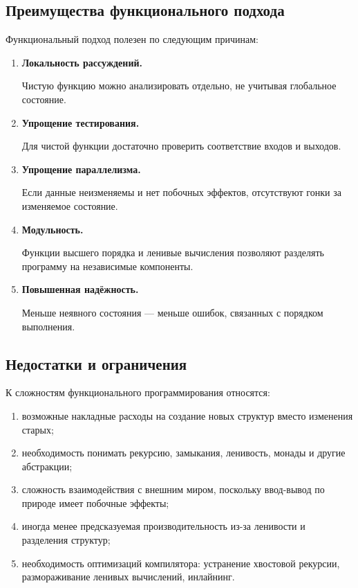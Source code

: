 \documentclass[12pt,a4paper]{article}
\begin{document}
\subsection{Преимущества функционального подхода}

Функциональный подход полезен по следующим причинам:

\begin{enumerate}
  \item \textbf{Локальность рассуждений.}

  Чистую функцию можно анализировать отдельно, не учитывая глобальное состояние.

  \item \textbf{Упрощение тестирования.}

  Для чистой функции достаточно проверить соответствие входов и выходов.

  \item \textbf{Упрощение параллелизма.}

  Если данные неизменяемы и нет побочных эффектов, отсутствуют гонки за изменяемое состояние.

  \item \textbf{Модульность.}

  Функции высшего порядка и ленивые вычисления позволяют разделять программу на независимые компоненты.

  \item \textbf{Повышенная надёжность.}

  Меньше неявного состояния --- меньше ошибок, связанных с порядком выполнения.
\end{enumerate}

\subsection{Недостатки и ограничения}

К сложностям функционального программирования относятся:

\begin{enumerate}
  \item возможные накладные расходы на создание новых структур вместо изменения старых;
  \item необходимость понимать рекурсию, замыкания, ленивость, монады и другие абстракции;
  \item сложность взаимодействия с внешним миром, поскольку ввод-вывод по природе имеет побочные эффекты;
  \item иногда менее предсказуемая производительность из-за ленивости и разделения структур;
  \item необходимость оптимизаций компилятора: устранение хвостовой рекурсии, размораживание ленивых вычислений, инлайнинг.
\end{enumerate}
\end{document}
